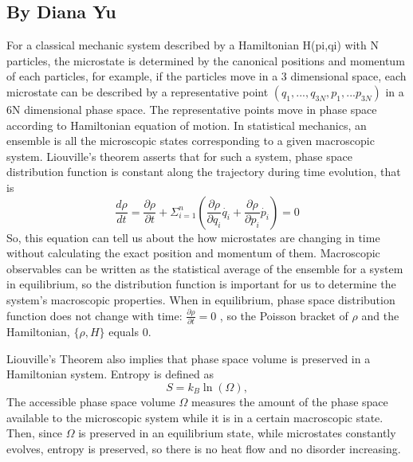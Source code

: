\subsection{By Diana Yu}
For a classical mechanic system described by a Hamiltonian H(pi,qi) with N particles, the microstate is determined by the canonical positions and momentum of each particles, for example, if the particles move in a 3 dimensional space, each microstate can be described by a representative point $(q_{1},...,q_{3N},p_{1},...p_{3N})$ in a 6N dimensional phase space. The representative points move in phase space according to Hamiltonian equation of motion. In statistical mechanics, an ensemble is all the microscopic states corresponding to a given macroscopic system. Liouville’s theorem asserts that for such a system, phase space distribution function is constant along the trajectory during time evolution, that is
\begin{equation}
\frac{d\rho}{dt} = \frac{\partial\rho}{\partial t} + \Sigma_{i = 1}^{n}(\frac{\partial\rho}{\partial q_{i}}\dot{q_{i}}+\frac{\partial\rho}{\partial p_{i}}\dot{p_{i}}) = 0
\end{equation}
So, this equation can tell us about the how microstates are changing in time without calculating the exact position and momentum of them. Macroscopic observables can be written as the statistical average of the ensemble for a system in equilibrium, so the distribution function is important for us to determine the system’s macroscopic properties. When in equilibrium, phase space distribution function does not change with time: $\frac{\partial\rho}{\partial t} = 0$
, so the Poisson bracket of $\rho$ and the Hamiltonian, $\{\rho, H\}$ equals 0.

Liouville’s Theorem also implies that phase space volume is preserved in a Hamiltonian system.
Entropy is defined as
\begin{equation}
	S = k_B\ln(\Omega),
\end{equation}
The accessible phase space volume $\Omega$ measures the amount of the phase space available to the microscopic system while it is in a certain macroscopic state. Then, since $\Omega$ is preserved in an equilibrium state, while microstates constantly evolves, entropy is preserved, so there is no heat flow and no disorder increasing.
